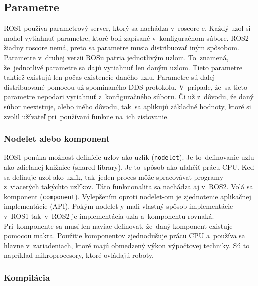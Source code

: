 \subsection{Parametre}

	ROS1 používa parametrový server, ktorý sa nachádza v~roscore-e. Každý uzol si mohol vytiahnuť parametre, ktoré boli zapísané v~konfiguračnom
	súbore. ROS2 žiadny roscore nemá, preto sa parametre musia distribuovať iným spôsobom. Parametre v~druhej verzii ROSu patria jednotlivým uzlom.
	To~znamená, že~jednotlivé parametre sa dajú vytiahnuť len daným uzlom. Tieto parametre taktiež existujú len počas existencie daného uzlu. Parametre
	sú ďalej distribuované pomocou už spomínaného DDS protokolu. V~prípade, že~sa tieto parametre nepodari vytiahnuť z~konfiguračného súboru. Či už z~dôvodu,
	že daný súbor neexistuje, alebo iného dôvodu, tak~sa aplikujú základné hodnoty, ktoré si zvolil užívateľ pri~používaní funkcie na~ich zisťovanie.

\subsubsection{Nodelet alebo komponent}

	ROS1 ponúka možnosť definície uzlov ako uzlík (\texttt{nodelet}). Je to~definovanie uzlu ako zdielanej knižnice (shared library). Je
	to~spôsob ako uľahčiť prácu CPU. Keď sa definuje uzol ako uzlík, tak~jeden proces môže spracovávať programy z~viacerých takýchto uzlíkov.
	Táto funkcionalita sa nachádza aj v~ROS2. Volá sa komponent (\texttt{component}). Vylepšením oproti nodelet-om je zjednotenie aplikačnej
	implementácie (API). Pokým nodelet-y mali vlastný spôsob implementácie v~ROS1 tak~v~ROS2 je implementácia uzla a~komponentu rovnaká.
	Pri~komponente sa musí len naviac definovať, že~daný komponent existuje pomocou makra. Použitie komponentov zjednodušuje prácu CPU
	a~používa sa hlavne v~zariadeniach, ktoré majú obmedzený výkon výpočtovej techniky. Sú to napríklad mikroprocesory, ktoré ovládajú roboty.

\subsubsection{Kompilácia}

